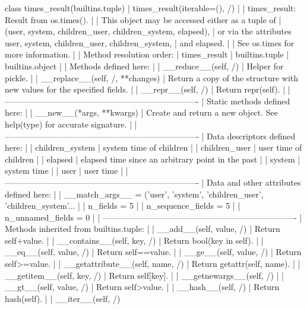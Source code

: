 \documentclass{article}
\begin{document}
    class times_result(builtins.tuple)
     |  times_result(iterable=(), /)
     |
     |  times_result: Result from os.times().
     |
     |  This object may be accessed either as a tuple of
     |    (user, system, children_user, children_system, elapsed),
     |  or via the attributes user, system, children_user, children_system,
     |  and elapsed.
     |
     |  See os.times for more information.
     |
     |  Method resolution order:
     |      times_result
     |      builtins.tuple
     |      builtins.object
     |
     |  Methods defined here:
     |
     |  __reduce__(self, /)
     |      Helper for pickle.
     |
     |  __replace__(self, /, **changes)
     |      Return a copy of the structure with new values for the specified fields.
     |
     |  __repr__(self, /)
     |      Return repr(self).
     |
     |  ----------------------------------------------------------------------
     |  Static methods defined here:
     |
     |  __new__(*args, **kwargs)
     |      Create and return a new object.  See help(type) for accurate signature.
     |
     |  ----------------------------------------------------------------------
     |  Data descriptors defined here:
     |
     |  children_system
     |      system time of children
     |
     |  children_user
     |      user time of children
     |
     |  elapsed
     |      elapsed time since an arbitrary point in the past
     |
     |  system
     |      system time
     |
     |  user
     |      user time
     |
     |  ----------------------------------------------------------------------
     |  Data and other attributes defined here:
     |
     |  __match_args__ = ('user', 'system', 'children_user', 'children_system'...
     |
     |  n_fields = 5
     |
     |  n_sequence_fields = 5
     |
     |  n_unnamed_fields = 0
     |
     |  ----------------------------------------------------------------------
     |  Methods inherited from builtins.tuple:
     |
     |  __add__(self, value, /)
     |      Return self+value.
     |
     |  __contains__(self, key, /)
     |      Return bool(key in self).
     |
     |  __eq__(self, value, /)
     |      Return self==value.
     |
     |  __ge__(self, value, /)
     |      Return self>=value.
     |
     |  __getattribute__(self, name, /)
     |      Return getattr(self, name).
     |
     |  __getitem__(self, key, /)
     |      Return self[key].
     |
     |  __getnewargs__(self, /)
     |
     |  __gt__(self, value, /)
     |      Return self>value.
     |
     |  __hash__(self, /)
     |      Return hash(self).
     |
     |  __iter__(self, /)
\end{document}
